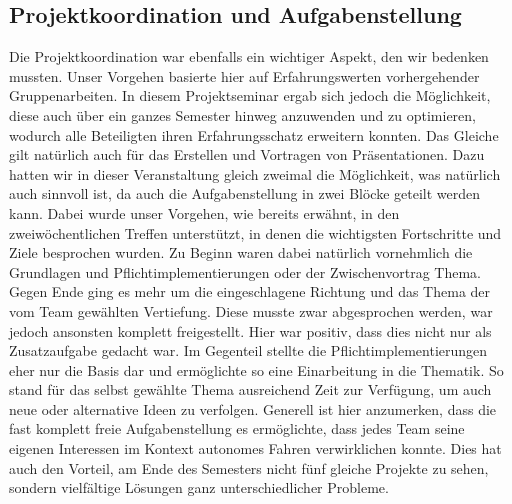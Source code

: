 \subsection{Projektkoordination und Aufgabenstellung}
Die Projektkoordination war ebenfalls ein wichtiger Aspekt, den wir bedenken mussten. Unser Vorgehen basierte hier auf Erfahrungswerten vorhergehender Gruppenarbeiten. In diesem Projektseminar ergab sich jedoch die Möglichkeit, diese auch über ein ganzes Semester hinweg anzuwenden und zu optimieren, wodurch alle Beteiligten ihren Erfahrungsschatz erweitern konnten. Das Gleiche gilt natürlich auch für das Erstellen und Vortragen von Präsentationen. Dazu hatten wir in dieser Veranstaltung gleich zweimal die Möglichkeit, was natürlich auch sinnvoll ist, da auch die Aufgabenstellung in zwei Blöcke geteilt werden kann. Dabei wurde unser Vorgehen, wie bereits erwähnt, in den zweiwöchentlichen Treffen unterstützt, in denen die wichtigsten Fortschritte und Ziele besprochen wurden. Zu Beginn waren dabei natürlich vornehmlich die Grundlagen und Pflichtimplementierungen oder der Zwischenvortrag Thema. Gegen Ende ging es mehr um die eingeschlagene Richtung und das Thema der vom Team gewählten Vertiefung. Diese musste zwar abgesprochen werden, war jedoch ansonsten komplett freigestellt. Hier war positiv, dass dies nicht nur als Zusatzaufgabe gedacht war. Im Gegenteil stellte die Pflichtimplementierungen eher nur die Basis dar und ermöglichte so eine Einarbeitung in die Thematik. So stand für das selbst gewählte Thema ausreichend Zeit zur Verfügung, um auch neue oder alternative Ideen zu verfolgen.
\newline
Generell ist hier anzumerken, dass die fast komplett freie Aufgabenstellung es ermöglichte, dass jedes Team seine eigenen  Interessen im Kontext autonomes Fahren verwirklichen konnte. Dies hat auch den Vorteil, am Ende des Semesters nicht fünf gleiche Projekte zu sehen, sondern vielfältige Lösungen ganz unterschiedlicher Probleme.



